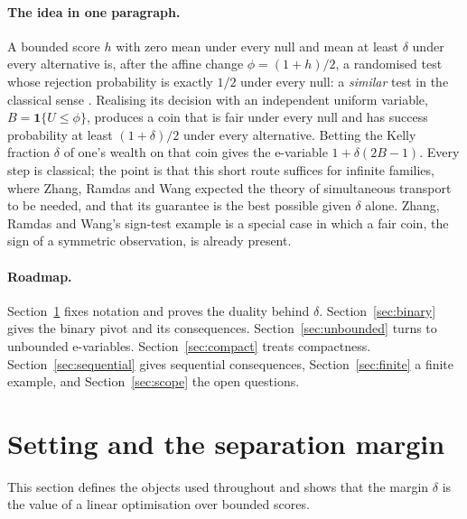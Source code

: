 \documentclass[11pt,a4paper]{article}
\theoremstyle{definition}
\theoremstyle{remark}
\newcommand{\one}{\mathbf 1}
\begin{document}
\paragraph{The idea in one paragraph.}
A bounded score \(h\) with zero mean under every null and mean at least \(\delta\) under every alternative is, after the affine change \(\phi=(1+h)/2\), a randomised test whose rejection probability is exactly \(1/2\) under every null: a \emph{similar} test in the classical sense \cite[Chapter~4]{LehmannRomano}. Realising its decision with an independent uniform variable, \(B=\one\{U\le\phi\}\), produces a coin that is fair under every null and has success probability at least \((1+\delta)/2\) under every alternative. Betting the Kelly fraction \(\delta\) of one's wealth on that coin gives the e-variable \(1+\delta(2B-1)\). Every step is classical; the point is that this short route suffices for infinite families, where Zhang, Ramdas and Wang expected the theory of simultaneous transport to be needed, and that its guarantee is the best possible given \(\delta\) alone. Zhang, Ramdas and Wang's sign-test example \cite[Example~6.11]{ZRW} is a special case in which a fair coin, the sign of a symmetric observation, is already present.

\paragraph{Roadmap.}
Section~\ref{sec:setting} fixes notation and proves the duality behind \(\delta\). Section~\ref{sec:binary} gives the binary pivot and its consequences. Section~\ref{sec:unbounded} turns to unbounded e-variables. Section~\ref{sec:compact} treats compactness. Section~\ref{sec:sequential} gives sequential consequences, Section~\ref{sec:finite} a finite example, and Section~\ref{sec:scope} the open questions.

\section{Setting and the separation margin}\label{sec:setting}

This section defines the objects used throughout and shows that the margin \(\delta\) is the value of a linear optimisation over bounded scores.
\end{document}
